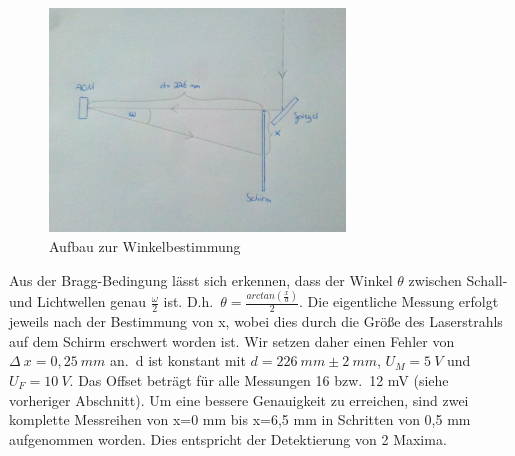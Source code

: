 \documentclass[bigchapter,colorback,accentcolor=tud4b,linedtoc,11pt]{tudreport}
\begin{document}
\begin{figure}[H] 
  \centering
     \includegraphics[width=0.7\textwidth]{img/omega-bestimmung.jpg}
  \caption[Cap for listoffigures]{Aufbau zur Winkelbestimmung}
  \label{fig:Bild1}
\end{figure}

Aus der Bragg-Bedingung lässt sich erkennen, dass der Winkel $\theta$ zwischen Schall- und Lichtwellen genau $\frac{\omega}{2}$ ist. D.h.\ $\theta = \frac{arc tan (\frac{x}{d})}{2}$. Die eigentliche Messung erfolgt jeweils nach der Bestimmung von x, wobei dies durch die Größe des Laserstrahls auf dem Schirm erschwert worden ist. Wir setzen daher einen Fehler von $\Delta~x = 0,25~mm$ an.\ d ist konstant mit $d = 226~mm \pm 2~mm$, $U_M = 5~V$ und $U_F = 10~V$. Das Offset beträgt für alle Messungen 16 bzw.\ 12 mV (siehe vorheriger Abschnitt). Um eine bessere Genauigkeit zu erreichen, sind zwei komplette Messreihen von x=0 mm bis x=6,5 mm in Schritten von 0,5 mm aufgenommen worden. Dies entspricht der Detektierung von 2 Maxima.
\end{document}
